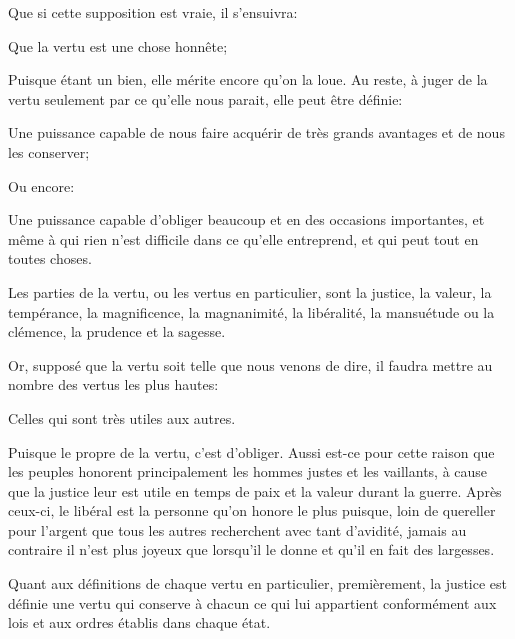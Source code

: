 Que si cette supposition est vraie, il s'ensuivra:

\begin{lieu}
	Que la vertu est une chose honnête;
\end{lieu}

Puisque étant un bien, elle mérite encore qu'on la loue. Au reste, à juger de la vertu seulement par ce qu'elle
nous parait, elle peut être définie:

\begin{emphpar}
	Une puissance capable de nous faire acquérir de très grands avantages et de nous les conserver;
\end{emphpar}

Ou encore:

\begin{emphpar}
	Une puissance capable d'obliger beaucoup et en des occasions importantes, et même à qui rien n'est difficile
	dans ce qu'elle entreprend, et qui peut tout en toutes choses.
\end{emphpar}

\bigbreak

Les parties de la vertu, ou les vertus en particulier, sont la justice, la valeur, la tempérance, la magnificence,
la magnanimité, la libéralité, la mansuétude ou la clémence, la prudence et la sagesse.

\bigbreak

Or, supposé que la vertu soit telle que nous venons de dire, il faudra mettre au nombre des vertus les plus hautes:

\begin{lieu}
	Celles qui sont très utiles aux autres.
\end{lieu}

Puisque le propre de la vertu, c'est d'obliger. Aussi est-ce pour cette raison que les peuples honorent
principalement les hommes justes et les vaillants, à cause que la justice leur est utile en temps de paix
et la valeur durant la guerre. Après ceux-ci, le libéral est la personne qu'on honore le plus puisque, loin
de quereller pour l'argent que tous les autres recherchent avec tant d'avidité, jamais au contraire il n'est
plus joyeux que lorsqu'il le donne et qu'il en fait des largesses.

\bigbreak

Quant aux définitions de chaque vertu en particulier, premièrement, la justice est définie une vertu qui
conserve à chacun ce qui lui appartient conformément aux lois et aux ordres établis dans chaque état.

